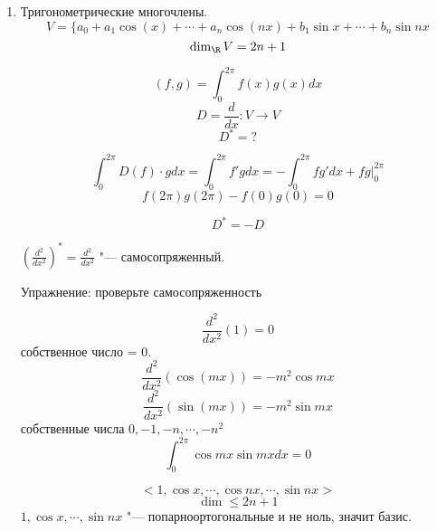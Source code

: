 \begin{enumerate}
\begin{proof}
    $$(x^2 - 1)\frac{d^2}{dx^2}(\frac{1}{2^nn!}\frac{d^m}{dx^m}(x^2 - 1)^m) + 2x\frac{d}{dx}(\frac{1}{2^nn!}\frac{d^m}{dx^m}(x^2 - 1)^m) =$$
    $$= m(m + 1)\frac{1}{2^nn!}\frac{d^m}{dx^m}(x^2 - 1)^m $$

    $$D(P_m(x)) = (x^2 - 1)\frac{d^2}{dx^2}P_{m}(x) + 2x \frac{d}{dx}P_m(x) = m(m + 1)P_m(x)$$

    $V_n, m  =0, 1, \cdots, n$
    $\{P_m\}$ "--- базис $V_m$ 
\end{proof}

Упражнение: 
    \begin{enumerate}
    \item 
    Проверить ортогональность многочленов Чебышева, Лагерра, Эрмита(для соответствующих весов). 
    \item
    Попробуйте найти дифференциальные операторв, чьими собственными функциями являются многочлен Чебышева, Лагерра и Эрмита. 
    \end{enumerate}

\item Тригонометрические многочлены. 
$$V = \{a_0 + a_1 \cos (x) + \cdots + a_n\cos(nx) + b_1 \sin x + \cdots + b_n \sin nx$$
$$\dim_{\R}V = 2n + 1$$

$$(f, g) = \int_{0}^{2 \pi}f(x)g(x)dx$$
$$D = \frac{d}{dx} \colon V \to V$$
$$D^* = ?$$

$$\int_{0}^{2\pi}D(f) \cdot g dx  = \int_{0}^{2\pi}f'g dx = -\int_{0}^{2\pi}fg'dx + fg|_{0}^{2\pi}$$
$$f(2\pi)g(2\pi) - f(0)g(0) = 0$$

$$D^* = -D$$

$(\frac{d^2}{dx^2})^* = \frac{d^2}{dx^2}$ "--- самосопряженный. 

Упражнение: проверьте самосопряженность 

$$\frac{d^2}{dx^2}(1) = 0$$
собственное число = 0.
$$\frac{d^2}{dx^2}(\cos(mx)) = -m^2\cos mx$$
$$\frac{d^2}{dx^2}(\sin(mx)) = -m^2\sin mx$$
собственные числа $0, -1,-n, \cdots, -n^2$
$$\int_{0}^{2\pi}\cos mx \sin mx dx = 0$$

$$<1,\cos x, \cdots, \cos nx, \cdots, \sin nx> $$
$$\dim \le 2n + 1$$
$1, \cos x, \cdots, \sin nx$ "--- попарноортогональные и не ноль, значит базис.
 
\end{enumerate}